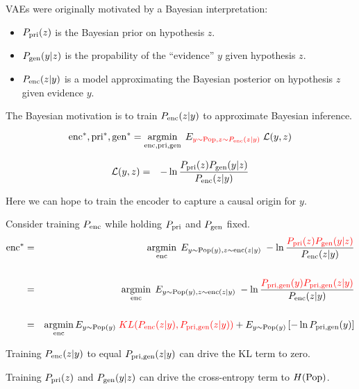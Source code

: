 {VAEs were originally motivated by a Bayesian interpretation:

\vfill
\begin{itemize}
\item $P_{\mathrm{pri}}(z)$ is the Bayesian prior on hypothesis $z$.

\vfill
\item $P_{\mathrm{gen}}(y|z)$ is the propability of the ``evidence'' $y$ given hypothesis $z$.

\vfill
\item $P_{\mathrm{enc}}(z|y)$ is a model approximating the Bayesian posterior on hypothesis $z$ given evidence $y$.
\end{itemize}

\vfill
The Bayesian motivation is to train $P_{\mathrm{enc}}(z|y)$ to approximate Bayesian inference.


$$\mathrm{enc}^*,\mathrm{pri}^*,\mathrm{gen}^* = \operatorname*{argmin}_{\mathrm{enc},\mathrm{pri},\mathrm{gen}}\;E_{\color{red} y \sim \mathrm{Pop},z\sim P_{\mathrm{enc}}(z|y)}\;{\cal L}(y,z)$$

\vfill
\begin{eqnarray*}
{\cal L}(y,z) & = & - \ln \frac{P_{\mathrm{pri}}(z)P_{\mathrm{gen}}(y|z)}{P_{\mathrm{enc}}(z|y)}
\end{eqnarray*}

\vfill
Here we can hope to train the encoder to capture a causal origin for $y$.


{\huge
Consider training $P_{\mathrm{enc}}$ while holding $P_{\mathrm{pri}}$ and $P_{\mathrm{gen}}$ fixed.
\begin{eqnarray*}
  \mathrm{enc}^* & = & \operatorname*{argmin}_{\mathrm{enc}} \;E_{y \sim \mathrm{Pop}(y),z \sim \mathrm{enc}(z|y)}\; - \ln \frac{\color{red} P_{\mathrm{pri}}(z)P_{\mathrm{gen}}(y|z)}{P_{\mathrm{enc}}(z|y)} \\
  \\
  & = & \operatorname*{argmin}_{\mathrm{enc}} \;E_{y \sim \mathrm{Pop}(y),z \sim \mathrm{enc}(z|y)}\; - \ln \frac{\color{red} P_{\mathrm{pri},\mathrm{gen}}(y)P_{\mathrm{pri},\mathrm{gen}}(z|y)}{P_{\mathrm{enc}}(z|y)} \\
  \\
  &= & \operatorname*{argmin}_{\mathrm{enc}} E_{y \sim \mathrm{Pop}(y)} \; {\color{red} KL(P_{\mathrm{enc}}(z|y),P_{\mathrm{pri},\mathrm{gen}}(z|y))} + E_{y\sim \mathrm{Pop}(y)}\left[-\ln P_{\mathrm{pri},\mathrm{gen}}(y)\right]
  \end{eqnarray*}

\vfill
Training $P_{\mathrm{enc}}(z|y)$ to equal $P_{\mathrm{pri},\mathrm{gen}}(z|y)$ can drive the KL term to zero.

\vfill
Training $P_{\mathrm{pri}}(z)$ and $P_{\mathrm{gen}}(y|z)$ can drive the cross-entropy term to $H(\mathrm{Pop})$.
}


}

